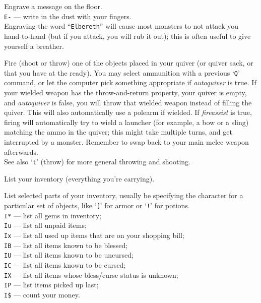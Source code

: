 \item[\tb{E}]
Engrave a message on the floor.\\
{\tt E-} --- write in the dust with your fingers.\\
Engraving the word ``{\tt Elbereth}'' will cause most monsters to not attack
you hand-to-hand (but if you attack, you will rub it out); this is
often useful to give yourself a breather.
\item[\tb{f}]
Fire (shoot or throw) one of the objects placed in your quiver (or
quiver sack, or that you have at the ready).
You may select ammunition with a previous `{\tt Q}' command, or let the
computer pick something appropriate if {\it autoquiver\/} is true.
If your wielded weapon has the throw-and-return property, your quiver
is empty, and {\it autoquiver\/}
is false, you will throw that wielded weapon instead of filling the quiver.
This will also automatically use a polearm if wielded.
If {\it fireassist\/} is true, firing will automatically try to wield a launcher
(for example, a bow or a sling) matching the ammo in the quiver; this might
take multiple turns, and get interrupted by a monster.
Remember to swap back to your main melee weapon afterwards.
\\
See also `{\tt t}' (throw) for more general throwing and shooting.
\item[\tb{i}]
List your inventory (everything you're carrying).
\item[\tb{I}]
List selected parts of your inventory, usually be specifying the character
for a particular set of objects, like `{\tt [}' for armor or `{\tt !}'
for potions.\\
{\tt I*} --- list all gems in inventory;\\
{\tt Iu} --- list all unpaid items;\\
{\tt Ix} --- list all used up items that are on your shopping bill;\\
{\tt IB} --- list all items known to be blessed;\\
{\tt IU} --- list all items known to be uncursed;\\
{\tt IC} --- list all items known to be cursed;\\
{\tt IX} --- list all items whose bless/curse status is unknown;\\
{\tt IP} --- list items picked up last;\\
{\tt I\$} --- count your money.
\item[\tb{o}]
